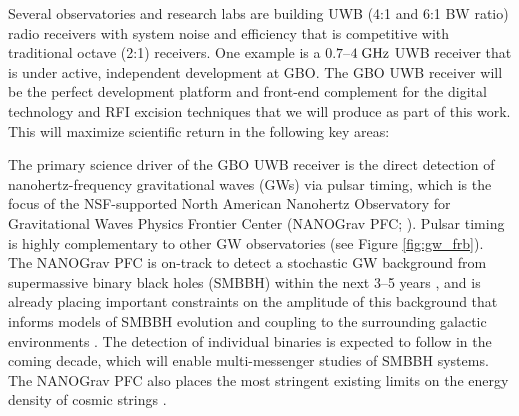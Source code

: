 \documentclass[10pt]{myNSF}
\begin{document}
\label{sec:uwbr}

Several observatories and research labs are building UWB (4:1 and 6:1
BW ratio) radio receivers with system noise and efficiency that is
competitive with traditional octave (2:1) receivers.  One example is a
$0.7$--$4\; \textrm{GHz}$ UWB receiver that is under active, independent
development at GBO.  The GBO UWB receiver will be the perfect
development platform and front-end complement for the digital
technology and RFI excision techniques that we will produce as part of
this work.  This will maximize scientific return in the following key
areas:

 The
primary science driver of the GBO UWB receiver is the direct detection
of nanohertz-frequency gravitational waves (GWs) via pulsar timing,
which is the focus of the NSF-supported North American Nanohertz
Observatory for Gravitational Waves Physics Frontier Center (NANOGrav
PFC; \cite{mcl13}).  Pulsar timing is highly complementary to other GW
observatories (see Figure \ref{fig:gw_frb}).  The NANOGrav PFC is
on-track to detect a stochastic GW background from supermassive binary
black holes (SMBBH) within the next 3--5 years \citep{tve+15}, and is
already placing important constraints on the amplitude of this
background that informs models of SMBBH evolution and coupling to the
surrounding galactic environments \citep{abb+16,abb+18}.  The
detection of individual binaries is expected to follow in the coming
decade, which will enable multi-messenger studies of SMBBH systems.
The NANOGrav PFC also places the most stringent existing limits on the
energy density of cosmic strings \citep{abb+18}.
\end{document}

